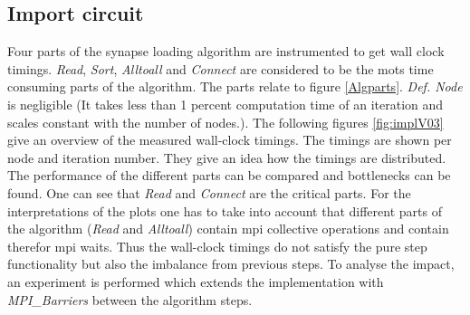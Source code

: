 \subsection{Import circuit}
Four parts of the synapse loading algorithm are instrumented to get wall clock timings.
\emph{Read}, \emph{Sort}, \emph{Alltoall} and \emph{Connect} are considered to be the mots time
consuming parts of the algorithm. The parts relate to figure \ref{Algparts}.
\emph{Def. Node} is negligible (It takes less than 1 percent computation time of an iteration and scales constant with the number of nodes.).
The following figures \ref{fig:implV03} give an overview of the measured wall-clock timings.
The timings are shown per node and iteration number. They give an idea how the timings are distributed.
The performance of the different parts can be compared and bottlenecks can be found.
One can see that \emph{Read} and \emph{Connect} are the critical parts.
For the interpretations of the plots one has to take into account that different parts of the algorithm
(\emph{Read} and \emph{Alltoall}) contain mpi collective operations and contain therefor mpi waits.
Thus the wall-clock timings do not satisfy the pure step functionality but also the imbalance from previous steps.
To analyse the impact, an experiment is performed which extends the implementation with \emph{MPI\_Barriers}
between the algorithm steps.
\newpage
